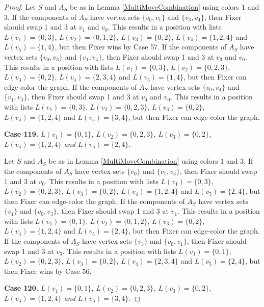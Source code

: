 \documentclass[12pt]{amsart}
\theoremstyle{plain}
\theoremstyle{definition}
\theoremstyle{remark}
\begin{document}
\begin{proof}
Let $S$ and $A_S$ be as in Lemma \ref{MultiMoveCombination} using colors $1$ and $3$. If the components of $A_S$ have vertex sets $\{v_0, v_1\}$ and $\{v_3, v_4\}$, then Fixer should swap 1 and 3 at $v_1$ and $v_0$. This results in a position with lists $L(v_1) = \{0, 3\}$, $L(v_2) = \{0, 1, 2\}$, $L(v_3) = \{0, 2\}$, $L(v_4) = \{1, 2, 4\}$ and $L(v_5) = \{1, 4\}$, but then Fixer wins by Case 57.
If the components of $A_S$ have vertex sets $\{v_0, v_3\}$ and $\{v_1, v_4\}$, then Fixer should swap 1 and 3 at $v_3$ and $v_0$. This results in a position with lists $L(v_1) = \{0, 3\}$, $L(v_2) = \{0, 2, 3\}$, $L(v_3) = \{0, 2\}$, $L(v_4) = \{2, 3, 4\}$ and $L(v_5) = \{1, 4\}$, but then Fixer can edge-color the graph.
If the components of $A_S$ have vertex sets $\{v_0, v_4\}$ and $\{v_1, v_3\}$, then Fixer should swap 1 and 3 at $v_4$ and $v_0$. This results in a position with lists $L(v_1) = \{0, 3\}$, $L(v_2) = \{0, 2, 3\}$, $L(v_3) = \{0, 2\}$, $L(v_4) = \{1, 2, 4\}$ and $L(v_5) = \{3, 4\}$, but then Fixer can edge-color the graph.

\noindent\textbf{Case 119.  }\textit{$L(v_1) = \{0, 1\}$, $L(v_2) = \{0, 2, 3\}$, $L(v_3) = \{0, 2\}$, $L(v_4) = \{1, 2, 4\}$ and $L(v_5) = \{2, 4\}$.}

Let $S$ and $A_S$ be as in Lemma \ref{MultiMoveCombination} using colors $1$ and $3$. If the components of $A_S$ have vertex sets $\{v_0\}$ and $\{v_1, v_3\}$, then Fixer should swap 1 and 3 at $v_0$. This results in a position with lists $L(v_1) = \{0, 3\}$, $L(v_2) = \{0, 2, 3\}$, $L(v_3) = \{0, 2\}$, $L(v_4) = \{1, 2, 4\}$ and $L(v_5) = \{2, 4\}$, but then Fixer can edge-color the graph.
If the components of $A_S$ have vertex sets $\{v_1\}$ and $\{v_0, v_3\}$, then Fixer should swap 1 and 3 at $v_1$. This results in a position with lists $L(v_1) = \{0, 1\}$, $L(v_2) = \{0, 1, 2\}$, $L(v_3) = \{0, 2\}$, $L(v_4) = \{1, 2, 4\}$ and $L(v_5) = \{2, 4\}$, but then Fixer can edge-color the graph.
If the components of $A_S$ have vertex sets $\{v_3\}$ and $\{v_0, v_1\}$, then Fixer should swap 1 and 3 at $v_3$. This results in a position with lists $L(v_1) = \{0, 1\}$, $L(v_2) = \{0, 2, 3\}$, $L(v_3) = \{0, 2\}$, $L(v_4) = \{2, 3, 4\}$ and $L(v_5) = \{2, 4\}$, but then Fixer wins by Case 56.

\noindent\textbf{Case 120.  }\textit{$L(v_1) = \{0, 1\}$, $L(v_2) = \{0, 2, 3\}$, $L(v_3) = \{0, 2\}$, $L(v_4) = \{1, 2, 4\}$ and $L(v_5) = \{3, 4\}$.}


\end{proof}
\end{document}
